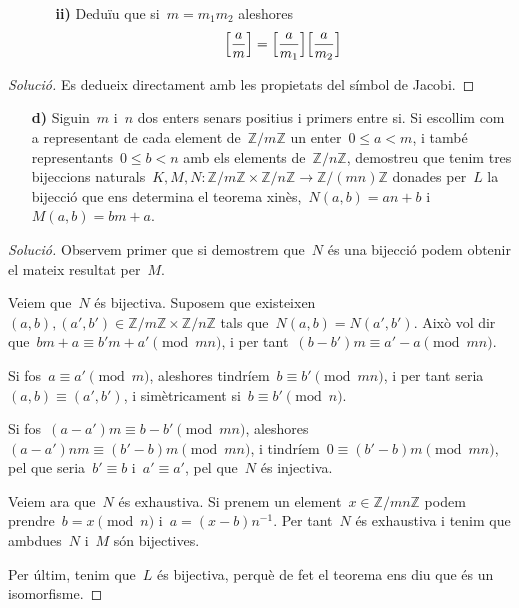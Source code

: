 \documentclass[a4paper]{article}
\newcommand{\ZZ}{\mathbb{Z}}
\newenvironment{solution}{
    \renewcommand\qedsymbol{\ensuremath{\lozenge}}
    \begin{proof}[Solució]
        }{
    \end{proof}
}
\begin{document}
\begin{enumerate}
    \item[] \begin{enumerate}
        \item[\textbf{ii)}] Deduïu que si~\(m=m_{1}m_{2}\) aleshores
            \[
                \Bigl[\frac{a}{m}\Bigr]
                =
                \Bigl[\frac{a}{m_{1}}\Bigr]
                \Bigl[\frac{a}{m_{2}}\Bigr]
            \]
    \end{enumerate}
\end{enumerate}

\begin{solution}
    Es dedueix directament amb les propietats del símbol de Jacobi.
\end{solution}

\begin{enumerate}
    \item[\textbf{d)}] Siguin~\(m\) i~\(n\) dos enters senars positius i primers
        entre si. Si escollim com a representant de cada element de~\(\ZZ/m\ZZ\)
        un enter~\(0\leq a<m\), i també representants~\(0\leq b<n\) amb els
        elements de~\(\ZZ/n\ZZ\), demostreu que tenim tres bijeccions
        naturals~\(K,M,N:\ZZ/m\ZZ\times\ZZ/n\ZZ\rightarrow\ZZ/(mn)\ZZ\) donades
        per~\(L\) la bijecció que ens determina el teorema
        xinès,~\(N(a,b)=an+b\) i~\(M(a,b)=bm+a\).
\end{enumerate}

\begin{solution}
    Observem primer que si demostrem que~\(N\) és una bijecció podem obtenir el
    mateix resultat per~\(M\).

    Veiem que~\(N\) és bijectiva. Suposem que
    existeixen~\((a,b),(a',b')\in\ZZ/m\ZZ\times\ZZ/n\ZZ\) tals
    que~\(N(a,b)=N(a',b')\). Això vol dir que~\(bm+a\equiv b'm+a'\pmod{mn}\), i
    per tant~\((b-b')m\equiv a'-a\pmod{mn}\).

    Si fos~\(a\equiv a'\pmod{m}\), aleshores tindríem~\(b\equiv b'\pmod{mn}\), i
    per tant seria~\((a,b)\equiv(a',b')\), i simètricament si~\(b\equiv
    b'\pmod{n}\).

    Si fos~\((a-a')m\equiv b-b'\pmod{mn}\),
    aleshores~\((a-a')nm\equiv(b'-b)m\pmod{mn}\), i
    tindríem~\(0\equiv(b'-b)m\pmod{mn}\), pel que seria~\(b'\equiv b\)
    i~\(a'\equiv a'\), pel que~\(N\) és injectiva.

    Veiem ara que~\(N\) és exhaustiva. Si prenem un element~\(x\in\ZZ/mn\ZZ\)
    podem prendre~\(b=x\pmod{n}\) i~\(a=(x-b)n^{-1}\). Per tant~\(N\) és
    exhaustiva i tenim que ambdues~\(N\) i~\(M\) són bijectives.

    Per últim, tenim que~\(L\) és bijectiva, perquè de fet el teorema ens diu
    que és un isomorfisme.
\end{solution}
\end{document}
